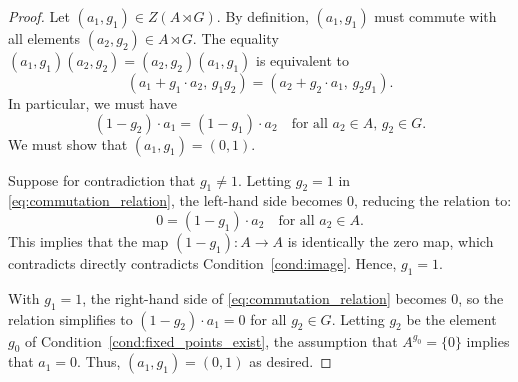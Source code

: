 \begin{proof}
Let $(a_1, g_1) \in Z(A \rtimes G)$. By definition, $(a_1, g_1)$ must commute with all elements $(a_2, g_2) \in A \rtimes G$. The equality $(a_1, g_1)(a_2, g_2) = (a_2, g_2)(a_1, g_1)$ is equivalent to
$$(a_1 + g_1 \cdot a_2, \, g_1 g_2) = (a_2 + g_2 \cdot a_1, \, g_2 g_1).$$
In particular, we must have 
\begin{equation}
\label{eq:commutation_relation}
(1 - g_2) \cdot a_1 = (1 - g_1) \cdot a_2 \quad \text{for all } a_2 \in A, \, g_2 \in G.
\end{equation}
We must show that $(a_1, g_1) = (0, 1)$. 

Suppose for contradiction that $g_1 \neq 1$. Letting $g_2 = 1$ in \eqref{eq:commutation_relation}, the left-hand side becomes $0$, reducing the relation to:
$$0 = (1 - g_1) \cdot a_2 \quad \text{for all } a_2 \in A.$$
This implies that the map $(1 - g_1): A \to A$ is identically the zero map, which contradicts directly contradicts Condition~\eqref{cond:image}. Hence, $g_1 = 1$.

With $g_1 = 1$, the right-hand side of \eqref{eq:commutation_relation} becomes $0$, so the relation simplifies to $(1 - g_2) \cdot a_1 = 0$ for all $g_2 \in G$. Letting $g_2$ be the element $g_0$ of Condition~\eqref{cond:fixed_points_exist}, the assumption that $A^{g_0} = \{0\}$ implies that $a_1 = 0$. Thus, $(a_1,g_1) = (0,1)$ as desired.
\end{proof}